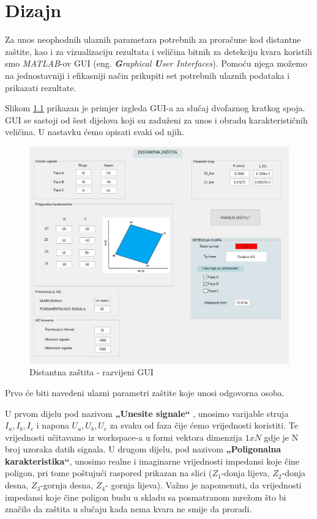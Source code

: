 \chapter{Dizajn}


Za unos neophodnih ulaznih parametara potrebnih za  proračune kod distantne zaštite, kao i za vizualizaciju rezultata i veličina bitnih za detekciju kvara koristili smo \textit{MATLAB}-ov GUI (eng. \textit{\textbf{G}raphical \textbf{U}ser \textit{I}nterfaces}). Pomoću njega možemo na jednostavniji i efikasniji način prikupiti set potrebnih ulaznih podataka i prikazati rezultate.


Slikom \ref{fig:GUI} prikazan je primjer izgleda GUI-a za slučaj dvofaznog kratkog spoja. GUI  se sastoji od šest dijelova koji su zaduženi za unos i obradu karakterističnih veličina. U nastavku ćemo opisati svaki od njih.

\begin{figure}[H]
  \centering
  \includegraphics[width=1\textwidth]{GUI}
  \caption{Distantna zaštita - razvijeni GUI}
  \label{fig:GUI}
\end{figure}


Prvo će biti navedeni ulazni parametri zaštite koje unosi odgovorna osoba.

U prvom dijelu pod nazivom \textbf{„Unesite signale“} , unosimo varijable struja $I_a, I_b, I_c$ i napona $U_a, U_b, U_c$ za svaku od faza čije ćemo vrijednosti koristiti. Te vrijednosti učitavamo iz workspace-a u formi vektora dimenzija $1xN$ gdje je N broj uzoraka datih signala. 
U drugom dijelu, pod nazivom \textbf{„Poligonalna karakteristika“}, unosimo realne i imaginarne vrijednosti impedansi koje čine poligon, pri tome poštujući raspored prikazan na slici ($Z_1$-donja lijeva, $Z_2$-donja desna, $Z_3$-gornja desna, $Z_4$- gornja lijeva). Važno je napomenuti, da vrijednosti impedansi koje čine poligon budu u skladu sa posmatranom mrežom što bi značilo da zaštita u slučaju kada nema kvara ne smije da proradi. 


